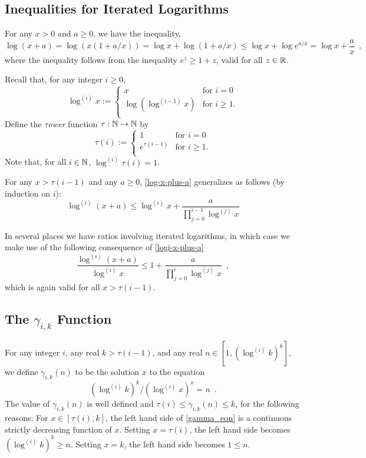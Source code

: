 \documentclass[kpfonts]{patmorin}
\theoremstyle{named}
\begin{document}
\subsection{Inequalities for Iterated Logarithms}

For any $x> 0$ and $a\ge 0$, we have the inequality,
\begin{equation}
    \log (x+a) = \log (x(1+a/x)) = \log x + \log(1+a/x) \le \log x + \log e^{a/x} = \log x + \frac{a}{x} \enspace , \label{log-x-plus-a}
\end{equation}
where the inequality follows from the inequality $e^z \ge 1+z$, valid for all $z\in\mathbb{R}$.

Recall that, for any integer $i\ge 0$,
\[
    \log^{(i)} x :=
      \begin{cases}
          x & \text{for $i=0$} \\
          \log\left(\log^{(i-1)}x\right) & \text{for $i\ge 1$.} \\
      \end{cases}
\]
Define the \emph{$\tau$ower} function $\tau:\mathbb{N}\to\mathbb{N}$ by
\[
  \tau(i) :=
    \begin{cases}
        1 & \text{for $i=0$} \\
        e^{\tau(i-1)} & \text{for $i\ge 1$.} \\
    \end{cases}
\]
Note that, for all $i\in\mathbb{N}$, $\log^{(i)}\tau(i)=1$.

For any $x > \tau(i-1)$ and any $a\ge 0$, \cref{log-x-plus-a} generalizes as follows (by induction on $i$):
\begin{equation}
    \log^{(i)}(x+a) \le \log^{(i)} x + \frac{a}{\prod_{j=0}^{i-1}\log^{(j)} x} \label{logi-x-plus-a}
\end{equation}

In several places we have ratios involving iterated logarithms, in which case we make use of the following consequence of \cref{logi-x-plus-a}
\begin{equation}
    \frac{\log^{(i)} (x+a)}{\log^{(i)} x} \le 1 + \frac{a}{\prod_{j=0}^{i}\log^{(j)} x} \enspace, \label{logi-ratio}
\end{equation}
which is again valid for all $x> \tau(i-1)$.

\subsection{The $\gamma_{i,k}$ Function}


For any integer $i$, any real $k>\tau(i-1)$, and any real $n\in[1,(\log^{(i)} k)^k]$, we define $\gamma_{i,k}(n)$ to be the solution $x$ to the equation
\begin{equation}
   (\log^{(i)} k)^k/(\log^{(i)} x)^{x}=n \enspace .  \label{gamma_eqn}
\end{equation}
The value of $\gamma_{i,k}(n)$ is well defined and $\tau(i)\le \gamma_{i,k}(n)\le k$, for the following reasons:  For $x\in[\tau(i),k]$, the left hand side of \cref{gamma_eqn} is a continuous strictly decreasing function of $x$. Setting $x=\tau(i)$, the left hand side becomes $(\log^{(i)} k)^k \ge n$. Setting $x=k$, the left hand side becomes $1\le n$.
\end{document}
